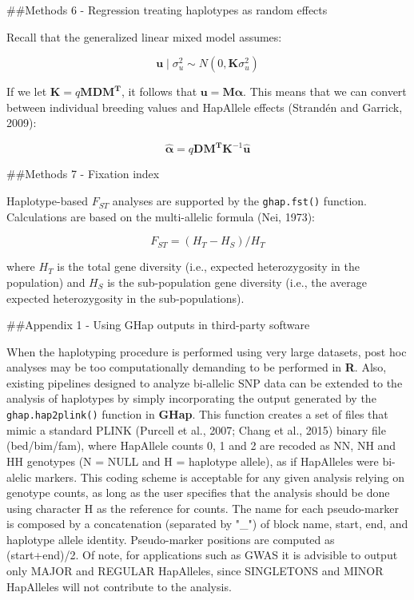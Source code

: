 \documentclass[
]{article}
\begin{document}
\pagebreak

\#\#Methods 6 - Regression treating haplotypes as random effects

Recall that the generalized linear mixed model assumes:

\[\mathbf{u} \mid \sigma_u^2 \sim N(0,\mathbf{K}\sigma_{u}^2)\]

If we let \(\mathbf{K} = q\mathbf{MDM^\text{T}}\), it follows that
\(\mathbf{u} = \mathbf{M}\mathbf{\alpha}\). This means that we can
convert between individual breeding values and HapAllele effects
(Strandén and Garrick, 2009):

\[\mathbf{\hat{\alpha}} = q\mathbf{DM^\text{T}}\mathbf{K}^{-1}\mathbf{\hat{u}}\]

\pagebreak

\#\#Methods 7 - Fixation index

Haplotype-based \(F_{ST}\) analyses are supported by the
\texttt{ghap.fst()} function. Calculations are based on the
multi-allelic formula (Nei, 1973):

\[F_{ST} = (H_T - H_S)/H_T\]

where \(H_T\) is the total gene diversity (i.e., expected heterozygosity
in the population) and \(H_S\) is the sub-population gene diversity
(i.e., the average expected heterozygosity in the sub-populations).

\pagebreak

\#\#Appendix 1 - Using GHap outputs in third-party software

When the haplotyping procedure is performed using very large datasets,
post hoc analyses may be too computationally demanding to be performed
in \textbf{R}. Also, existing pipelines designed to analyze bi-allelic
SNP data can be extended to the analysis of haplotypes by simply
incorporating the output generated by the \texttt{ghap.hap2plink()}
function in \textbf{GHap}. This function creates a set of files that
mimic a standard PLINK (Purcell et al., 2007; Chang et al., 2015) binary
file (bed/bim/fam), where HapAllele counts 0, 1 and 2 are recoded as NN,
NH and HH genotypes (N = NULL and H = haplotype allele), as if
HapAlleles were bi-alelic markers. This coding scheme is acceptable for
any given analysis relying on genotype counts, as long as the user
specifies that the analysis should be done using character H as the
reference for counts. The name for each pseudo-marker is composed by a
concatenation (separated by "\_") of block name, start, end, and
haplotype allele identity. Pseudo-marker positions are computed as
(start+end)/2. Of note, for applications such as GWAS it is advisible to
output only MAJOR and REGULAR HapAlleles, since SINGLETONS and MINOR
HapAlleles will not contribute to the analysis.
\end{document}
